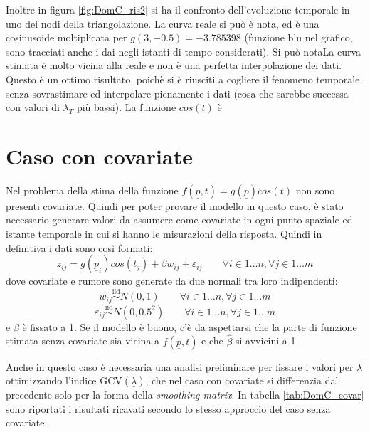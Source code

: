 \documentclass[a4paper,11pt,twoside,openright]{book}							%
\begin{document}
Inoltre in figura \ref{fig:DomC_ris2} si ha il confronto dell'evoluzione temporale in uno dei nodi della triangolazione. La curva reale si può è nota, ed è una cosinusoide moltiplicata per $g(3,-0.5)=-3.785398$ (funzione blu nel grafico, sono tracciati anche i dai negli istanti di tempo considerati). Si può notaLa curva stimata è molto vicina alla reale e non è una perfetta interpolazione dei dati. Questo è un ottimo risultato, poichè si è riusciti a cogliere il fenomeno temporale senza sovrastimare ed interpolare pienamente i dati (cosa che sarebbe successa con valori di $\lambda_T$ più bassi). La funzione $cos(t)$ è 



\section{Caso con covariate}
Nel problema della stima della funzione $f(\underline p,t)=g(\underline p)cos(t)$ non sono presenti covariate. Quindi per poter provare il modello in questo caso, è stato necessario generare valori da assumere come covariate in ogni punto spaziale ed istante temporale in cui si hanno le misurazioni della risposta. Quindi in definitiva i dati sono così formati:
$$
z_{ij}=g(\underline p_{i})cos(t_j) + \beta w_{ij} + \varepsilon_{ij} \qquad \forall i \in 1\ldots n, \forall j \in 1\ldots m
$$
dove covariate e rumore sono generate da due normali tra loro indipendenti:
$$
w_{ij}\stackrel{\mathrm{iid}}{\sim}N(0,1) \qquad \forall i \in 1\ldots n, \forall j \in 1\ldots m
$$
$$
\varepsilon_{ij}\stackrel{\mathrm{iid}}{\sim}N(0,0.5^2) \qquad \forall i \in 1\ldots n, \forall j \in 1\ldots m
$$
e $\beta$ è fissato a 1. Se il modello è buono, c'è da aspettarsi che la parte di funzione stimata senza covariate sia vicina a $f(\underline p,t)$ e che $\hat{\beta}$ si avvicini a 1.
 
Anche in questo caso è necessaria una analisi preliminare per fissare i valori per $\lambda$ ottimizzando l'indice $\mathrm{GCV}(\underline \lambda)$, che nel caso con covariate si differenzia dal precedente solo per la forma della \textit{smoothing matrix}. In tabella \ref{tab:DomC_covar} sono riportati i risultati ricavati secondo lo stesso approccio del caso senza covariate.
\end{document}
